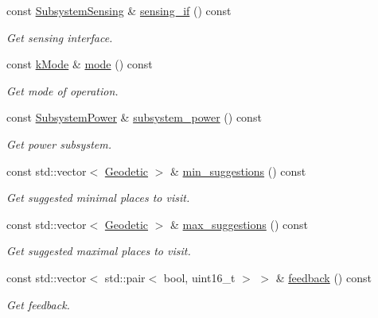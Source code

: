 \begin{DoxyCompactItemize}
const \hyperlink{classosse_1_1collaborate_1_1_subsystem_sensing}{Subsystem\+Sensing} \& \hyperlink{classosse_1_1collaborate_1_1_node_a38b667613384c4481da24ab6631f0ee2}{sensing\+\_\+if} () const
\begin{DoxyCompactList}\small\item\em Get sensing interface. \end{DoxyCompactList}\item 
const \hyperlink{classosse_1_1collaborate_1_1_node_a6f8b0270e42a0c2059d7b554acfbd3db}{k\+Mode} \& \hyperlink{classosse_1_1collaborate_1_1_node_a524a1e53ef230698b7d29435c7ff7dae}{mode} () const
\begin{DoxyCompactList}\small\item\em Get mode of operation. \end{DoxyCompactList}\item 
const \hyperlink{classosse_1_1collaborate_1_1_subsystem_power}{Subsystem\+Power} \& \hyperlink{classosse_1_1collaborate_1_1_node_a62c89064d7fb5c92822518cdc996f8f6}{subsystem\+\_\+power} () const
\begin{DoxyCompactList}\small\item\em Get power subsystem. \end{DoxyCompactList}\item 
const std\+::vector$<$ \hyperlink{classosse_1_1collaborate_1_1_geodetic}{Geodetic} $>$ \& \hyperlink{classosse_1_1collaborate_1_1_node_a5bfc3c5ea5ca059b0154f270dfd8971c}{min\+\_\+suggestions} () const
\begin{DoxyCompactList}\small\item\em Get suggested minimal places to visit. \end{DoxyCompactList}\item 
const std\+::vector$<$ \hyperlink{classosse_1_1collaborate_1_1_geodetic}{Geodetic} $>$ \& \hyperlink{classosse_1_1collaborate_1_1_node_a883dae4381225516446aa574b9c9a12b}{max\+\_\+suggestions} () const
\begin{DoxyCompactList}\small\item\em Get suggested maximal places to visit. \end{DoxyCompactList}\item 
const std\+::vector$<$ std\+::pair$<$ bool, uint16\+\_\+t $>$ $>$ \& \hyperlink{classosse_1_1collaborate_1_1_node_ad04ee8d4b8b52e49b561b50cdb67e2d3}{feedback} () const
\begin{DoxyCompactList}\small\item\em Get feedback. \end{DoxyCompactList}\item 

\end{DoxyCompactItemize}
